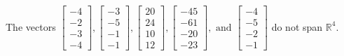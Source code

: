 \begin{exercise}
\begin{exerciseStatement}
  \end{exerciseStatement}
  \begin{exerciseAnswer}
   The vectors \(\left[\begin{array}{r}
-4 \\
-2 \\
-3 \\
-4
\end{array}\right] , \left[\begin{array}{r}
-3 \\
-5 \\
-1 \\
-1
\end{array}\right] , \left[\begin{array}{r}
20 \\
24 \\
10 \\
12
\end{array}\right] , \left[\begin{array}{r}
-45 \\
-61 \\
-20 \\
-23
\end{array}\right] , \text{ and } \left[\begin{array}{r}
-4 \\
-5 \\
-2 \\
-1
\end{array}\right]\) 
  	 do not  
	span \(\mathbb{R}^4\).
  


  \end{exerciseAnswer}
\end{exercise}